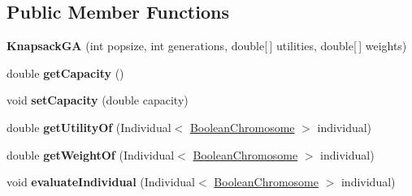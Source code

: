 \subsection*{Public Member Functions}
\begin{DoxyCompactItemize}
\item 
\hypertarget{classjenes_1_1tutorials_1_1old_1_1problem6_1_1_knapsack_g_a_a422824d96285c3b2f61c4fc7b827740b}{{\bfseries Knapsack\-G\-A} (int popsize, int generations, double\mbox{[}$\,$\mbox{]} utilities, double\mbox{[}$\,$\mbox{]} weights)}\label{classjenes_1_1tutorials_1_1old_1_1problem6_1_1_knapsack_g_a_a422824d96285c3b2f61c4fc7b827740b}

\item 
\hypertarget{classjenes_1_1tutorials_1_1old_1_1problem6_1_1_knapsack_g_a_ad781c31a74a81403fed4c9d366debd39}{double {\bfseries get\-Capacity} ()}\label{classjenes_1_1tutorials_1_1old_1_1problem6_1_1_knapsack_g_a_ad781c31a74a81403fed4c9d366debd39}

\item 
\hypertarget{classjenes_1_1tutorials_1_1old_1_1problem6_1_1_knapsack_g_a_a48beb6d0837db170693758d40fa3fcd0}{void {\bfseries set\-Capacity} (double capacity)}\label{classjenes_1_1tutorials_1_1old_1_1problem6_1_1_knapsack_g_a_a48beb6d0837db170693758d40fa3fcd0}

\item 
\hypertarget{classjenes_1_1tutorials_1_1old_1_1problem6_1_1_knapsack_g_a_a1afed02357ac8bd62bf23b34132a1c30}{double {\bfseries get\-Utility\-Of} (Individual$<$ \hyperlink{classjenes_1_1chromosome_1_1_boolean_chromosome}{Boolean\-Chromosome} $>$ individual)}\label{classjenes_1_1tutorials_1_1old_1_1problem6_1_1_knapsack_g_a_a1afed02357ac8bd62bf23b34132a1c30}

\item 
\hypertarget{classjenes_1_1tutorials_1_1old_1_1problem6_1_1_knapsack_g_a_a3fad8fde8f1c75f2f39665b872578551}{double {\bfseries get\-Weight\-Of} (Individual$<$ \hyperlink{classjenes_1_1chromosome_1_1_boolean_chromosome}{Boolean\-Chromosome} $>$ individual)}\label{classjenes_1_1tutorials_1_1old_1_1problem6_1_1_knapsack_g_a_a3fad8fde8f1c75f2f39665b872578551}

\item 
\hypertarget{classjenes_1_1tutorials_1_1old_1_1problem6_1_1_knapsack_g_a_a4a5ada923a1c65269c5cea2431865df5}{void {\bfseries evaluate\-Individual} (Individual$<$ \hyperlink{classjenes_1_1chromosome_1_1_boolean_chromosome}{Boolean\-Chromosome} $>$ individual)}\label{classjenes_1_1tutorials_1_1old_1_1problem6_1_1_knapsack_g_a_a4a5ada923a1c65269c5cea2431865df5}

\end{DoxyCompactItemize}


